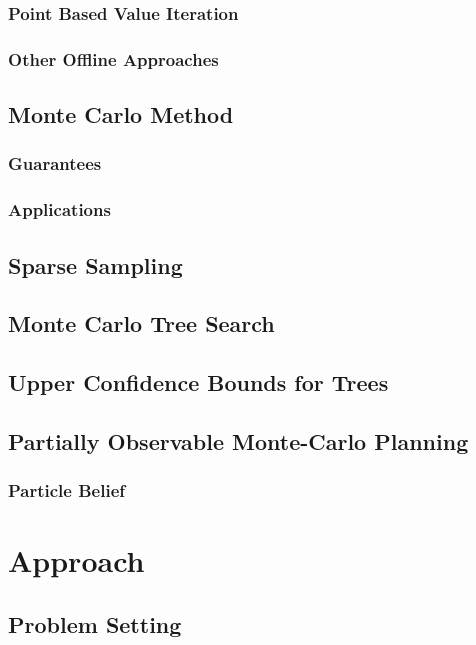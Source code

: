 \documentclass[10pt,twoside]{report}
\begin{document}
        \subsection{Point Based Value Iteration}
        \subsection{Other Offline Approaches}

    \section{Monte Carlo Method}
        \subsection{Guarantees}
        \subsection{Applications}

    \section{Sparse Sampling}

    \section{Monte Carlo Tree Search}

    \section{Upper Confidence Bounds for Trees}

    \section{Partially Observable Monte-Carlo Planning}
        \subsection{Particle Belief}

\chapter{Approach}\label{ref:approach}

    \section{Problem Setting}
\end{document}
